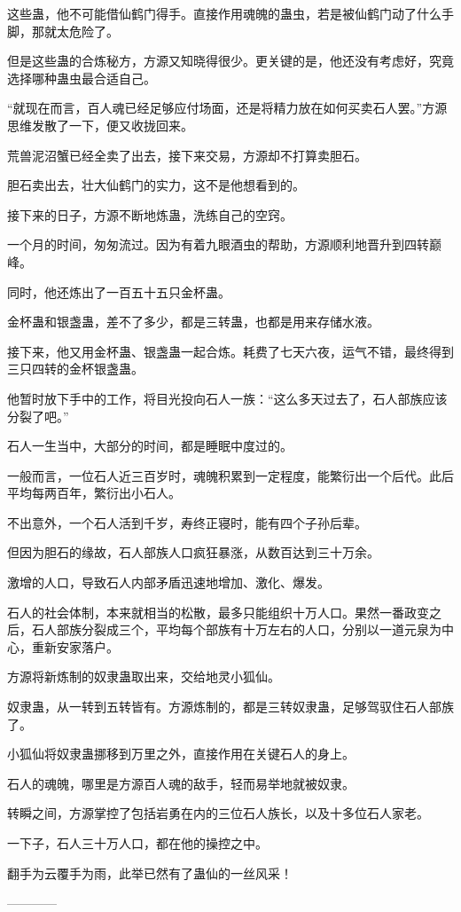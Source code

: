 \begin{this_body}
这些蛊，他不可能借仙鹤门得手。直接作用魂魄的蛊虫，若是被仙鹤门动了什么手脚，那就太危险了。

但是这些蛊的合炼秘方，方源又知晓得很少。更关键的是，他还没有考虑好，究竟选择哪种蛊虫最合适自己。

“就现在而言，百人魂已经足够应付场面，还是将精力放在如何买卖石人罢。”方源思维发散了一下，便又收拢回来。

荒兽泥沼蟹已经全卖了出去，接下来交易，方源却不打算卖胆石。

胆石卖出去，壮大仙鹤门的实力，这不是他想看到的。

接下来的日子，方源不断地炼蛊，洗练自己的空窍。

一个月的时间，匆匆流过。因为有着九眼酒虫的帮助，方源顺利地晋升到四转巅峰。

同时，他还炼出了一百五十五只金杯蛊。

金杯蛊和银盏蛊，差不了多少，都是三转蛊，也都是用来存储水液。

接下来，他又用金杯蛊、银盏蛊一起合炼。耗费了七天六夜，运气不错，最终得到三只四转的金杯银盏蛊。

他暂时放下手中的工作，将目光投向石人一族：“这么多天过去了，石人部族应该分裂了吧。”

石人一生当中，大部分的时间，都是睡眠中度过的。

一般而言，一位石人近三百岁时，魂魄积累到一定程度，能繁衍出一个后代。此后平均每两百年，繁衍出小石人。

不出意外，一个石人活到千岁，寿终正寝时，能有四个子孙后辈。

但因为胆石的缘故，石人部族人口疯狂暴涨，从数百达到三十万余。

激增的人口，导致石人内部矛盾迅速地增加、激化、爆发。

石人的社会体制，本来就相当的松散，最多只能组织十万人口。果然一番政变之后，石人部族分裂成三个，平均每个部族有十万左右的人口，分别以一道元泉为中心，重新安家落户。

方源将新炼制的奴隶蛊取出来，交给地灵小狐仙。

奴隶蛊，从一转到五转皆有。方源炼制的，都是三转奴隶蛊，足够驾驭住石人部族了。

小狐仙将奴隶蛊挪移到万里之外，直接作用在关键石人的身上。

石人的魂魄，哪里是方源百人魂的敌手，轻而易举地就被奴隶。

转瞬之间，方源掌控了包括岩勇在内的三位石人族长，以及十多位石人家老。

一下子，石人三十万人口，都在他的操控之中。

翻手为云覆手为雨，此举已然有了蛊仙的一丝风采！

------------

\end{this_body}

